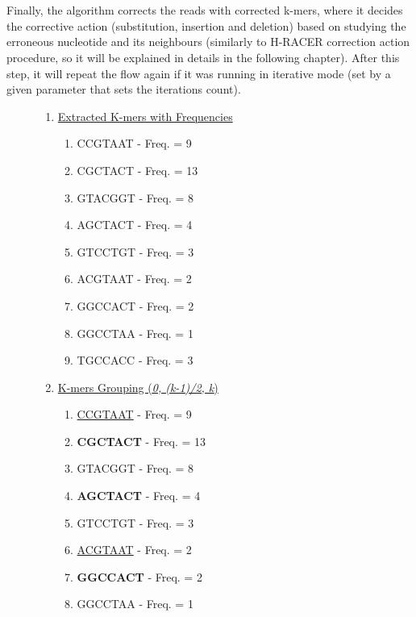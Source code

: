 \documentclass[12pt,openany]{llncs}
\begin{document}
\\
\\
Finally, the algorithm corrects the reads with corrected k-mers, where it decides the corrective action (substitution, insertion and deletion) based on studying the erroneous nucleotide and its neighbours (similarly to H-RACER \cite{HRACER} correction action procedure, so it will be explained in details in the following chapter). After this step, it will repeat the flow again if it was running in iterative mode (set by a given parameter that sets the iterations count).

\begin{figure}
\vspace{0cm}
\begin{bordered}
\begin{enumerate}
	\item \underline{Extracted K-mers with Frequencies}
	\begin{enumerate}
		\item CCGTAAT - Freq. = 9
		\item CGCTACT - Freq. = 13
		\item GTACGGT - Freq. = 8
		\item AGCTACT - Freq. = 4
		\item GTCCTGT - Freq. = 3
		\item ACGTAAT - Freq. = 2
		\item GGCCACT - Freq. = 2
		\item GGCCTAA - Freq. = 1
		\item TGCCACC - Freq. = 3
	\end{enumerate}
	\item \underline{K-mers Grouping (\textit{0, (k-1)/2, k})}
	  \begin{enumerate}
		\item \underline{CCGTAAT} \hspace{1.8ex}- Freq. = 9
		\item \textbf{CGCTACT} - Freq. = 13
		\item GTACGGT \hspace{1.8ex}- Freq. = 8
		\item \textbf{AGCTACT} - Freq. = 4
		\item GTCCTGT \hspace{1.8ex}- Freq. = 3
		\item \underline{ACGTAAT} \hspace{1.8ex}- Freq. = 2
		\item \textbf{GGCCACT} - Freq. = 2
		\item GGCCTAA \hspace{1.8ex}- Freq. = 1

\end{enumerate}
\end{enumerate}
\end{bordered}
\end{figure}
\end{document}
